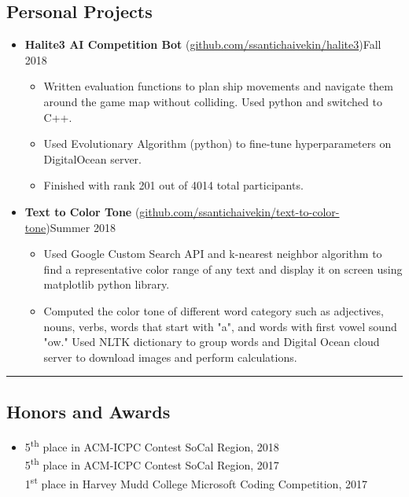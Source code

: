 \documentclass[10.5pt,letterpaper]{article}
\begin{document}
\subsection*{Personal Projects}
  \begin{itemize}
    \parskip=-0.45em
    \item[]
    {\textbf{Halite3 AI Competition Bot} (\href{https://github.com/ssantichaivekin/halite3}
    {github.com/ssantichaivekin/halite3})\hfill {Fall 2018}}
    \begin{itemize}[label=\textbullet]
        \item  Written evaluation functions to plan ship movements and navigate them around the game map without colliding.
        Used python and switched to C++.
        \item Used Evolutionary Algorithm (python) to fine-tune hyperparameters on DigitalOcean server.
        \item Finished with rank 201 out of 4014 total participants.
    \end{itemize}
    \vspace{0.1em}
    \item[]
    {\textbf{Text to Color Tone} (\href{https://github.com/ssantichaivekin/text-to-color-tone}
    {github.com/ssantichaivekin/text-to-color-tone})\hfill {Summer 2018}}
    \begin{itemize}[label=\textbullet]
        \item  Used Google Custom Search API and k-nearest neighbor algorithm to find a representative color range 
        of any text and display it on screen using matplotlib python library.
        \item  Computed the color tone of different word category such as adjectives, nouns, verbs, 
        words that start with "a", and words with first vowel sound "ow." Used NLTK dictionary to 
        group words and Digital Ocean cloud server to download images and perform calculations.
    \end{itemize}
    \vspace{0.1em}
  \end{itemize}

\hrule
\vspace{-0.95em}
\subsection*{Honors and Awards}
  \begin{itemize}
    \parskip=-0.5em
    \item[]
    {5\textsuperscript{th} place in ACM-ICPC Contest SoCal Region, 2018}\\
    {5\textsuperscript{th} place in ACM-ICPC Contest SoCal Region, 2017}\\
    {1\textsuperscript{st} place in Harvey Mudd College Microsoft Coding Competition, 2017}
  \end{itemize}

\end{document}
